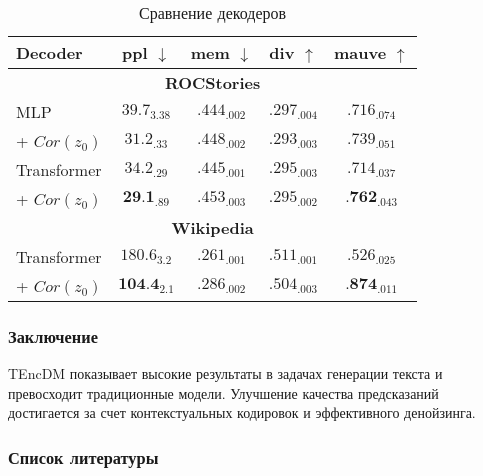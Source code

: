 \documentclass{beamer}
\begin{document}
\begin{frame}
\begin{table}
\centering
\begin{tabular}{l|cccc}
\hline
\textbf{Decoder} & \textbf{ppl} $\downarrow$ & \textbf{mem} $\downarrow$ & \textbf{div} $\uparrow$ & \textbf{mauve} $\uparrow$ \\
\hline
\multicolumn{5}{c}{\textbf{ROCStories}} \\
\hline
MLP & $39.7_{3.38}$ & $.444_{.002}$ & $.297_{.004}$ & $.716_{.074}$ \\
\; + $Cor(z_0)$ & $31.2_{.33}$ & $.448_{.002}$ & $.293_{.003}$ & $.739_{.051}$ \\
Transformer & $34.2_{.29}$ & $.445_{.001}$ & $.295_{.003}$ & $.714_{.037}$ \\
\; + $Cor(z_0)$ & $\textbf{29.1}_{.89}$ & ${.453}_{.003}$ & ${.295}_{.002}$ & $\textbf{.762}_{.043}$ \\
\hline
\multicolumn{5}{c}{\textbf{Wikipedia}} \\
\hline
Transformer & $180.6_{3.2}$ & $.261_{.001}$ & $.511_{.001}$ & $.526_{.025}$ \\
\; + $Cor(z_0)$ & $\textbf{104.4}_{2.1}$ & $.286_{.002}$ & $.504_{.003}$ & $\textbf{.874}_{.011}$ \\
\hline
\end{tabular}
\caption{Сравнение декодеров}
\label{tab::decoders}
\end{table}
\end{frame}

\begin{frame}
\frametitle{Заключение}
TEncDM показывает высокие результаты в задачах генерации текста и превосходит традиционные модели. Улучшение качества предсказаний достигается за счет контекстуальных кодировок и эффективного денойзинга.
\end{frame}

\begin{frame}
\frametitle{Список литературы}


\end{frame}
\end{document}
